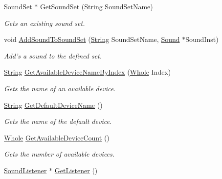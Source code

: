 \begin{DoxyCompactItemize}
\hyperlink{classphys_1_1SoundSet}{SoundSet} $\ast$ \hyperlink{classphys_1_1SoundManager_a419edd2aed481ed7eff4beb11c9a6cf2}{GetSoundSet} (\hyperlink{namespacephys_aa03900411993de7fbfec4789bc1d392e}{String} SoundSetName)
\begin{DoxyCompactList}\small\item\em Gets an existing sound set. \item\end{DoxyCompactList}\item 
void \hyperlink{classphys_1_1SoundManager_a89c05a5628e187939ea30b0e4b149931}{AddSoundToSoundSet} (\hyperlink{namespacephys_aa03900411993de7fbfec4789bc1d392e}{String} SoundSetName, \hyperlink{classphys_1_1Sound}{Sound} $\ast$SoundInst)
\begin{DoxyCompactList}\small\item\em Add's a sound to the defined set. \item\end{DoxyCompactList}\item 
\hyperlink{namespacephys_aa03900411993de7fbfec4789bc1d392e}{String} \hyperlink{classphys_1_1SoundManager_a842f7cba6b12585bca77f642ecb8be79}{GetAvailableDeviceNameByIndex} (\hyperlink{namespacephys_a460f6bc24c8dd347b05e0366ae34f34a}{Whole} Index)
\begin{DoxyCompactList}\small\item\em Gets the name of an available device. \item\end{DoxyCompactList}\item 
\hyperlink{namespacephys_aa03900411993de7fbfec4789bc1d392e}{String} \hyperlink{classphys_1_1SoundManager_ac4814331683597034b26fac5c1c69bfa}{GetDefaultDeviceName} ()
\begin{DoxyCompactList}\small\item\em Gets the name of the default device. \item\end{DoxyCompactList}\item 
\hyperlink{namespacephys_a460f6bc24c8dd347b05e0366ae34f34a}{Whole} \hyperlink{classphys_1_1SoundManager_adb5717af71da8829600fd613a2ce615b}{GetAvailableDeviceCount} ()
\begin{DoxyCompactList}\small\item\em Gets the number of available devices. \item\end{DoxyCompactList}\item 
\hyperlink{classphys_1_1SoundListener}{SoundListener} $\ast$ \hyperlink{classphys_1_1SoundManager_af0c700e283c44c20466185e1150fc6a3}{GetListener} ()

\end{DoxyCompactItemize}
